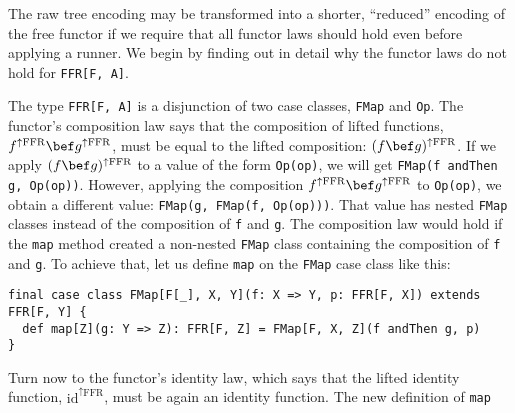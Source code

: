 The raw tree encoding may be transformed into a shorter, \textsf{``}reduced\textsf{''}
encoding of the free functor if we require that all functor laws should
hold even before applying a runner. We begin by finding out in detail
why the functor laws do not hold for \lstinline!FFR[F, A]!.

The type \lstinline!FFR[F, A]!
is a disjunction of two case classes, \lstinline!FMap!
and \lstinline!Op!. The
functor\textsf{'}s composition law says that the composition of lifted functions,
$f^{\uparrow\text{FFR}}\bef g^{\uparrow\text{FFR}}$, must be equal
to the lifted composition: $(f\bef g)^{\uparrow\text{FFR}}$. If we
apply $(f\bef g)^{\uparrow\text{FFR}}$ to a value of the form \lstinline!Op(op)!,
we will get \lstinline!FMap(f andThen g, Op(op))!.
However, applying the composition $f^{\uparrow\text{FFR}}\bef g^{\uparrow\text{FFR}}$
to \lstinline!Op(op)!,
we obtain a different value: \lstinline!FMap(g, FMap(f, Op(op)))!.
That value has nested \lstinline!FMap!
classes instead of the composition of \lstinline!f!
and \lstinline!g!. The
composition law would hold if the \lstinline!map!
method created a non-nested \lstinline!FMap!
class containing the composition of \lstinline!f!
and \lstinline!g!. To achieve
that, let us define \lstinline!map!
on the \lstinline!FMap!
case class like this:
\begin{lstlisting}
final case class FMap[F[_], X, Y](f: X => Y, p: FFR[F, X]) extends FFR[F, Y] {
  def map[Z](g: Y => Z): FFR[F, Z] = FMap[F, X, Z](f andThen g, p)
}
\end{lstlisting}
Turn now to the functor\textsf{'}s identity law, which says that the lifted
identity function, $\text{id}^{\uparrow\text{FFR}}$, must be again
an identity function. The new definition of \lstinline!map!
